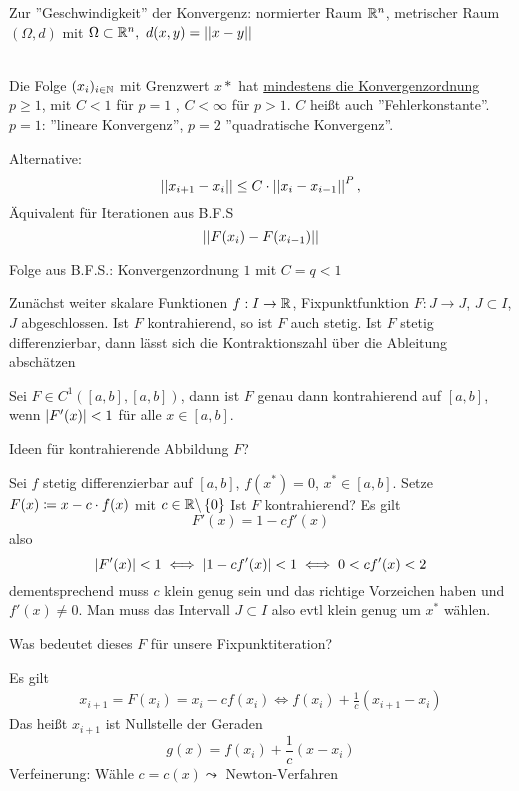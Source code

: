 \documentclass[../Skript.tex]{subfiles}
\begin{document}
Zur ''Geschwindigkeit'' der Konvergenz: \typicherweise normierter Raum \(\mathbb{R}^n\), metrischer Raum \((\Omega,d)\) mit \(\Omega\subset\R^n,\ d(x,y)=\dabs{x-y}
\)
\begin{definition}\hfill\\
Die Folge \((x_i)_{i\in\mathbb{N}}\) mit Grenzwert \(x*\) hat \underline{mindestens die Konvergenzordnung \(p \geq 1\)},
mit \(C<1\) für \(p=1\) , \(C<\infty\) für \(p>1\). \(C\) heißt auch ''Fehlerkonstante''.
\(p=1\): ''lineare Konvergenz'', \(p=2\) ''quadratische Konvergenz''.
\end{definition}
\begin{definition}
    Alternative: \[
    \left\vert\left\vert x_{i+1}-x_i\right\vert\right\vert\leq C\cdot \left\vert\left\vert x_i-x_{i-1}\right\vert\right\vert^P,
    \] Äquivalent für Iterationen aus B.F.S \[
    \left\vert\left\vert F(x_i)-F(x_{i-1})\right\vert\right\vert
    \]
\end{definition}
Folge aus B.F.S.: Konvergenzordnung \(1\) mit \(C=q<1\)

Zunächst weiter skalare Funktionen $f:I\to \mathbb{R}$, Fixpunktfunktion $F:J\to J$, $J\subset I$,
$J$ abgeschlossen. Ist $F$ kontrahierend, so ist $F$ auch stetig. Ist $F$ stetig
differenzierbar, dann lässt sich die Kontraktionszahl über die Ableitung abschätzen
\begin{lemma}
    Sei $F\in C^1([a,b],[a,b])$, dann ist $F$ genau dann kontrahierend auf $[a,b]$, wenn
    $\left\vert F'(x) \right\vert < 1$ für alle $x\in[a,b]$. 
\end{lemma}
\begin{question}
    Ideen für kontrahierende Abbildung $F$?
\end{question}
Sei $f$ stetig differenzierbar auf $[a,b]$, $f(x^*) = 0$, $x^*\in [a,b]$. Setze 
$F(x) \coloneqq x-c\cdot f(x)$ mit $c\in \mathbb{R}\backslash \left\{ 0 \right\}$
Ist $F$ kontrahierend? Es gilt \[F'(x) = 1-cf'(x)\]
also \[
    \left\vert F'(x) \right\vert < 1 \iff \left\vert 1-cf'(x) \right\vert < 1 \iff 0 < cf'(x) < 2\]
dementsprechend muss $c$ klein genug sein und das richtige Vorzeichen haben und $f'(x) \neq 0$.
Man muss das Intervall $J\subset I$ also evtl klein genug um $x^*$ wählen.

\begin{question}
    Was bedeutet dieses $F$ für unsere Fixpunktiteration?
\end{question}
Es gilt \begin{align*}
    x_{i+1} = F(x_i) = x_i - cf(x_i) \iff f(x_i) + \frac{1}{c} (x_{i+1} - x_i)
\end{align*}
Das heißt $x_{i+1}$ ist Nullstelle der Geraden \[
    g(x) = f(x_i) + \frac{1}{c}(x-x_i)\]
Verfeinerung: Wähle $c=c(x) \leadsto \text{ Newton-Verfahren}$




\typicherweise
\end{document}
